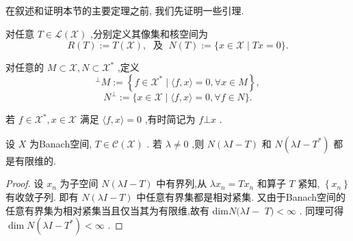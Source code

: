 \documentclass[lang=cn,newtx,10pt,scheme=chinese,thmcnt=chapter]{elegantbook}
\begin{document}
在叙述和证明本节的主要定理之前, 我们先证明一些引理.
\begin{definition}
    对任意 \(T \in  \mathcal{L}\left( \mathcal{X}\right)\) ,分别定义其像集和核空间为
\begin{equation*}
R\left( T\right)  \mathrel{\text{ := }} T\left( \mathcal{X}\right) ,\;\text{ 及 }\;N\left( T\right)  \mathrel{\text{ := }} \{ x \in  \mathcal{X} \mid  {Tx} = 0\} .
\end{equation*}

对任意的 \(M \subset  \mathcal{X},N \subset  {\mathcal{X}}^{ * }\) ,定义
\begin{equation*}
{}^{ \bot  }M \mathrel{\text{ := }} \left\{  {f \in  {\mathcal{X}}^{ * }\mid \langle f,x\rangle  = 0,\forall x \in  M}\right\}  ,
\end{equation*}
\begin{equation*}
{N}^{ \bot  } \mathrel{\text{ := }} \{ x \in  \mathcal{X} \mid  \langle f,x\rangle  = 0,\forall f \in  N\} .
\end{equation*}

若 \(f \in  {\mathcal{X}}^{ * },x \in  \mathcal{X}\) 满足 \(\langle f,x\rangle  = 0\) ,有时简记为 \(f \bot  x\) .
\end{definition}
\begin{lemma}
    设 \(X\) 为Banach空间, \(T \in  \mathcal{C}\left( \mathcal{X}\right)\) .  若 \(\lambda  \neq  0\) ,则 \(N\left( {{\lambda I} - T}\right)\) 和 \(N\left( {{\lambda I} - {T}^{ * }}\right)\) 都是有限维的.

\end{lemma}
\begin{proof}
设 \({x}_{n}\) 为子空间 \(N\left( {{\lambda I} - T}\right)\) 中有界列,从 \(\lambda {x}_{n} = T{x}_{n}\) 和算子 \(T\) 紧知, \(\left\{  {x}_{n}\right\}\) 有收敛子列. 即有 \(N\left( {{\lambda I} - T}\right)\) 中任意有界集都是相对紧集. 又由于Banach空间的任意有界集为相对紧集当且仅当其为有限维,故有 \(\mathrm{{dim}}N({\lambda I} -\)  \(T) < \infty\) . 同理可得 \(\dim N\left( {{\lambda I} - {T}^{ * }}\right)  < \infty\) .

\end{proof}
\end{document}
